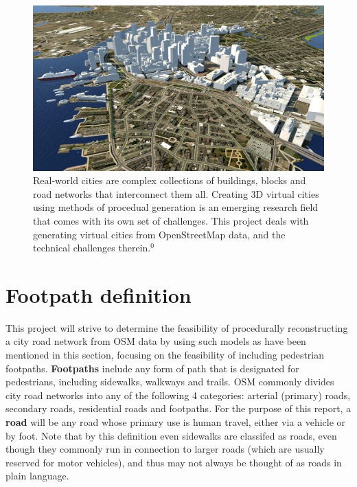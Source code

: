 \documentclass{kththesis}
\begin{document}
\begin{figure}[H]
    \centering
    \includegraphics[width=\textwidth,height=0.5\textheight,keepaspectratio]{img_virtual_city}
    \caption{Real-world cities are complex collections of buildings, blocks and road networks that interconnect them all. Creating 3D virtual cities using methods of procedual generation is an emerging research field that comes with its own set of challenges. This project deals with generating virtual cities from OpenStreetMap data, and the technical challenges therein.$^0$}
    \label{fig:virtual-city}
\end{figure}


\section{Footpath definition}

This project will strive to determine the feasibility of procedurally reconstructing a city road network from OSM data by using such models as have been mentioned in this section, focusing on the feasibility of including pedestrian footpaths.
\textbf{Footpaths} include any form of path that is designated for pedestrians, including sidewalks, walkways and trails.
OSM commonly divides city road networks into any of the following 4 categories: arterial (primary) roads, secondary roads, residential roads and footpaths.
For the purpose of this report, a \textbf{road} will be any road whose primary use is human travel, either via a vehicle or by foot.
Note that by this definition even sidewalks are classifed as roads, even though they commonly run in connection to larger roads (which are usually reserved for motor vehicles), and thus may not always be thought of as roads in plain language.
\end{document}
